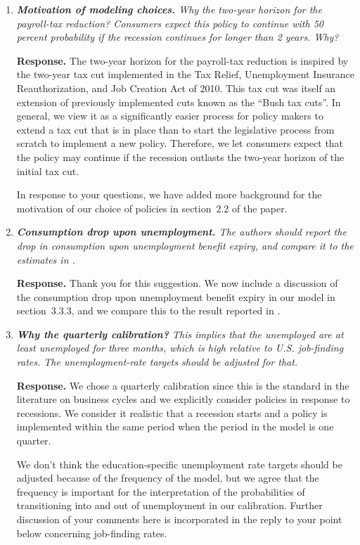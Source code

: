 \documentclass[12pt,letterpaper,english]{article}
\begin{document}
\begin{enumerate}
\begin{enumerate}
		\item \textit{\textbf{Motivation of modeling choices.} Why the two-year horizon for the payroll-tax	reduction? Consumers expect this policy to continue with 50 percent	probability if the recession continues for longer than 2 years. Why?}

		\noindent \textbf{Response.} The two-year horizon for the payroll-tax reduction is inspired by the two-year tax cut implemented in the Tax Relief, Unemployment Insurance Reauthorization, and Job Creation Act of 2010. This tax cut was itself an extension of previously implemented cuts known as the ``Bush tax cuts''. In general, we view it as a significantly easier process for policy makers to extend a tax cut that is in place than to start the legislative process from scratch to implement a new policy. Therefore, we let consumers expect that the policy may continue if the recession outlasts the two-year horizon of the initial tax cut.
		
		In response to your questions, we have added more background for the motivation of our choice of policies in section~2.2 of the paper.  

		\item \textit{\textbf{Consumption drop upon unemployment.} The authors should report the drop in consumption upon unemployment benefit expiry, and compare it to the estimates in \citet{ganongConsumer2019}.}

		\noindent \textbf{Response.} Thank you for this suggestion. We now include a discussion of the consumption drop upon unemployment benefit expiry in our model in section~3.3.3, and we compare this to the result reported in \citet{ganongConsumer2019}. 
	
		\item \textit{\textbf{Why the quarterly calibration?} This implies that the unemployed are at least unemployed for three months, which is high relative to U.S. job-finding rates. The unemployment-rate targets should be adjusted for that.}

		\noindent \textbf{Response.} We chose a quarterly calibration since this is the standard in the literature on business cycles and we explicitly consider policies in response to recessions. We consider it realistic that a recession starts and a policy is implemented within the same period when the period in the model is one quarter.
		
		We don't think the education-specific unemployment rate targets should be adjusted because of the frequency of the model, but we agree that the frequency is important for the interpretation of the probabilities of transitioning into and out of unemployment in our calibration. Further discussion of your comments here is incorporated in the reply to your point below concerning job-finding rates. 
		

\end{enumerate}
\end{enumerate}
\end{document}
